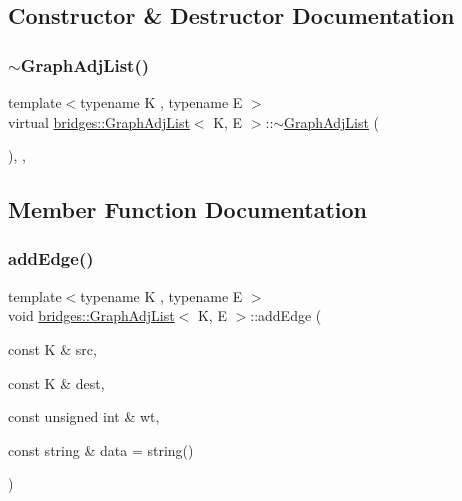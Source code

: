 \subsection{Constructor \& Destructor Documentation}
\hypertarget{classbridges_1_1_graph_adj_list_a72a783f3136b10b5abef0c32364e9ea1}{}\label{classbridges_1_1_graph_adj_list_a72a783f3136b10b5abef0c32364e9ea1} 
\subsubsection{\texorpdfstring{$\sim$\+Graph\+Adj\+List()}{~GraphAdjList()}}
{\footnotesize\ttfamily template$<$typename K , typename E $>$ \\
virtual \hyperlink{classbridges_1_1_graph_adj_list}{bridges\+::\+Graph\+Adj\+List}$<$ K, E $>$\+::$\sim$\hyperlink{classbridges_1_1_graph_adj_list}{Graph\+Adj\+List} (\begin{DoxyParamCaption}{ }\end{DoxyParamCaption})\hspace{0.3cm}{\ttfamily [inline]}, {\ttfamily [override]}, {\ttfamily [virtual]}}



\subsection{Member Function Documentation}
\hypertarget{classbridges_1_1_graph_adj_list_a0e53ad3b952a149e48e785c55ea2d6f6}{}\label{classbridges_1_1_graph_adj_list_a0e53ad3b952a149e48e785c55ea2d6f6} 
\subsubsection{\texorpdfstring{add\+Edge()}{addEdge()}}
{\footnotesize\ttfamily template$<$typename K , typename E $>$ \\
void \hyperlink{classbridges_1_1_graph_adj_list}{bridges\+::\+Graph\+Adj\+List}$<$ K, E $>$\+::add\+Edge (\begin{DoxyParamCaption}\item[{const K \&}]{src,  }\item[{const K \&}]{dest,  }\item[{const unsigned int \&}]{wt,  }\item[{const string \&}]{data = {\ttfamily string()} }\end{DoxyParamCaption})\hspace{0.3cm}{\ttfamily [inline]}}

